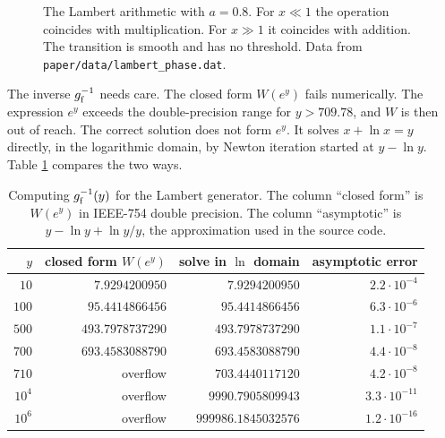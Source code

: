 \documentclass[11pt,a4paper]{article}
\begin{document}
\begin{figure}[t]
\centering
{}
\caption{The Lambert arithmetic with $a=0.8$. For $x\ll1$ the operation
coincides with multiplication. For $x\gg1$ it coincides with addition. The
transition is smooth and has no threshold. Data from
\texttt{paper/data/lambert\_phase.dat}.}
\label{fig:phase}
\end{figure}

The inverse $g_{\mathrm{f}}^{-1}$ needs care. The closed form $W(e^{y})$ fails numerically. The
expression $e^{y}$ exceeds the double-precision range for $y>709.78$, and $W$ is
then out of reach. The correct solution does not form $e^{y}$. It solves
$x+\ln x=y$ directly, in the logarithmic domain, by Newton iteration started at
$y-\ln y$. Table \ref{tab:lambert} compares the two ways.

\begin{table}[t]
\centering
\small
\caption{Computing $g_{\mathrm{f}}^{-1}(y)$ for the Lambert generator. The column ``closed
form'' is $W(e^{y})$ in IEEE-754 double precision. The column ``asymptotic'' is
$y-\ln y+\ln y/y$, the approximation used in the source code.}
\label{tab:lambert}
\begin{tabular}{@{}rrrr@{}}
\toprule
$y$ & closed form $W(e^{y})$ & solve in $\ln$ domain & asymptotic error \\
\midrule
$10$      & $7.9294200950$  & $7.9294200950$  & $2.2\cdot10^{-4}$ \\
$100$     & $95.4414866456$ & $95.4414866456$ & $6.3\cdot10^{-6}$ \\
$500$     & $493.7978737290$& $493.7978737290$& $1.1\cdot10^{-7}$ \\
$700$     & $693.4583088790$& $693.4583088790$& $4.4\cdot10^{-8}$ \\
$710$     & overflow        & $703.4440117120$& $4.2\cdot10^{-8}$ \\
$10^{4}$  & overflow        & $9990.7905809943$ & $3.3\cdot10^{-11}$ \\
$10^{6}$  & overflow        & $999986.1845032576$ & $1.2\cdot10^{-16}$ \\
\bottomrule
\end{tabular}
\end{table}
\end{document}
